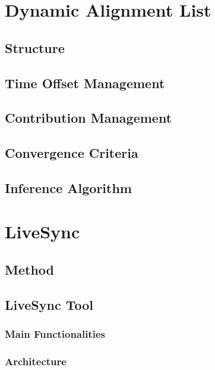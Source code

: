 \documentclass[jidm,a4paper]{jidm} %
\begin{document}
\section{Dynamic Alignment List}


\subsection{Structure}


\subsection{Time Offset Management}


\subsection{Contribution Management}


\subsection{Convergence Criteria}


\subsection{Inference Algorithm}


\section{LiveSync}


\subsection{Method}


\subsection{LiveSync Tool}


\subsubsection{Main Functionalities}


\subsubsection{Architecture}

\end{document}
